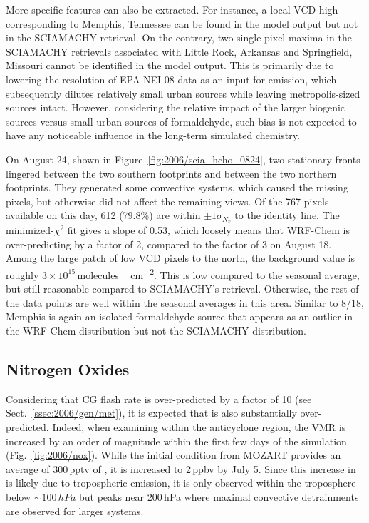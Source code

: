 More specific features can also be extracted. For instance, a  local VCD high corresponding to Memphis, Tennessee can be found in the model output but not in the
SCIAMACHY retrieval. On the contrary, two single-pixel maxima in the SCIAMACHY retrievals associated with Little Rock, Arkansas and Springfield, Missouri cannot be identified
in the model output. This is primarily due to lowering the resolution of EPA NEI-08 data as an input for emission, which subsequently dilutes relatively small urban sources while
leaving metropolis-sized sources intact. However, considering the relative impact of the larger biogenic sources versus small urban sources of formaldehyde, such bias is not expected
to have any noticeable influence in the long-term simulated chemistry.

On August 24, shown in Figure~\ref{fig:2006/scia_hcho_0824}, two stationary fronts lingered between the two southern footprints and between the two northern footprints. They generated
some convective systems, which caused the missing pixels, but otherwise did not affect the remaining views. Of the 767 pixels available on this day, 612 (79.8\%) are within $\pm1\sigma_{N_v}$
to the identity line. The minimized-$\chi^2$ fit gives a slope of 0.53, which loosely means that WRF-Chem is over-predicting by a factor of 2, compared to the factor of 3 on August 18.
Among the large patch of low VCD pixels to the north, the background value is roughly $3\times10^{15}$\,\unit{molecules\,cm^{-2}}. This is low compared to the \citet{Millet:2008oq}
seasonal average, but still reasonable compared to SCIAMACHY's retrieval. Otherwise, the rest of the data points are well within the seasonal averages in this area. Similar to 8/18,
Memphis is again an isolated formaldehyde source that appears as an outlier in the WRF-Chem distribution but not the SCIAMACHY distribution.

\subsection{Nitrogen Oxides}\label{ssec:2006/gen/nox}

Considering that CG flash rate is over-predicted by a factor of 10 (see Sect.~\ref{ssec:2006/gen/met}), it is expected that  is also substantially over-predicted. Indeed, when examining
within the anticyclone region,  the  VMR is increased by an order of magnitude  within the first few days of the simulation (Fig.~\ref{fig:2006/nox}). While the initial condition from
MOZART provides an average of 300\,\unit{pptv} of , it is increased to 2\,\unit{ppbv} by July 5. Since this increase in  is likely due to tropospheric {\lnox} emission, it is only
observed within the troposphere below $\sim100\,\unit{hPa}$ but peaks near 200\,\unit{hPa} where maximal convective detrainments are observed for larger systems.

